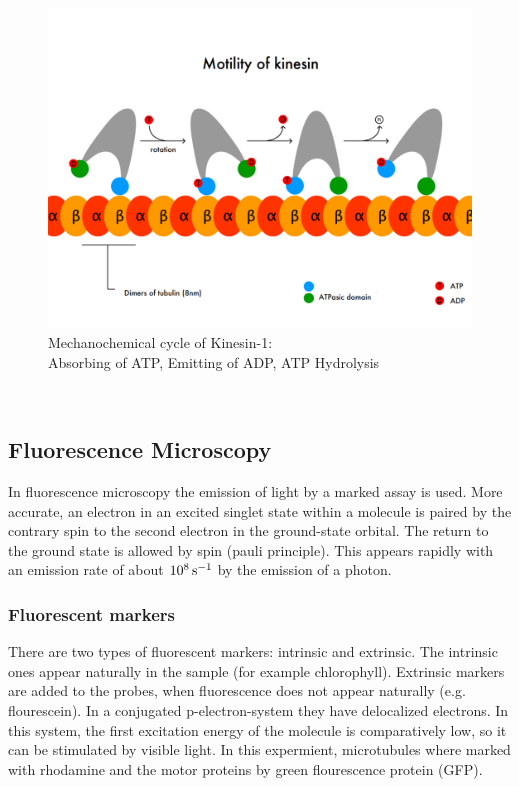 		\begin{figure}[h]
				 			\centering
				 		   	\captionsetup{justification=centering}            
				 		    	  \includegraphics[scale=0.3]{pic/kinesin.png}
				 		    \caption{Mechanochemical cycle of Kinesin-1:\\ Absorbing of ATP, Emitting of ADP, ATP Hydrolysis\cite{wikiKinesin}}
				 		   	\label{int:kinesin} 
				\end{figure}\\
	\subsection{Fluorescence Microscopy}
       In fluorescence microscopy the emission of light by a marked assay is used. More accurate, an electron in an excited singlet state within a molecule is paired by the contrary spin to the second electron in the ground-state orbital. The return to the ground state is allowed by spin (pauli principle). This appears rapidly with an emission rate of about $\unit[10^8]{s^{-1}}$ by the emission of a photon.
        \subsubsection{Fluorescent markers}
            There are two types of fluorescent markers: intrinsic and extrinsic. The intrinsic ones appear naturally in the sample (for example chlorophyll). Extrinsic markers are added to the probes, when fluorescence does not appear naturally (e.g. flourescein).
            In a conjugated p-electron-system they have delocalized electrons. In this system, the first excitation energy of the molecule is comparatively low, so it can be stimulated by visible light.
            In this expermient, microtubules where marked with rhodamine and the motor proteins by green flourescence protein (GFP).
